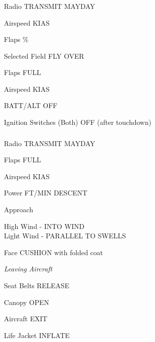 \begin{multicols}{2}
\subsubsection*{}

\begin{enumerate*}
\item Radio \dotfill TRANSMIT MAYDAY
\item Airspeed  KIAS
\item Flaps \%
\item Selected Field \dotfill FLY OVER
\item Flaps \dotfill FULL
\item Airspeed  KIAS
\item BATT/ALT \dotfill OFF
\item Ignition Switches (Both) \dotfill OFF (after touchdown)
\end{enumerate*}


\subsubsection*{}

\begin{enumerate*}
\item Radio \dotfill TRANSMIT MAYDAY
\item Flaps \dotfill FULL
\item Airspeed  KIAS
\item Power  FT/MIN DESCENT
\item Approach \raggedright \dotfill High Wind - INTO WIND\\\hfill Light Wind - PARALLEL TO SWELLS
\item Face \dotfill CUSHION with folded coat
\item \emph{Leaving Aircraft}

\begin{itemize*}
  \item Seat Belts \dotfill RELEASE
  \item Canopy \dotfill OPEN
  \item Aircraft \dotfill EXIT
  \item Life Jacket \dotfill INFLATE 
  \end{itemize*}
\end{enumerate*}


\end{multicols}
